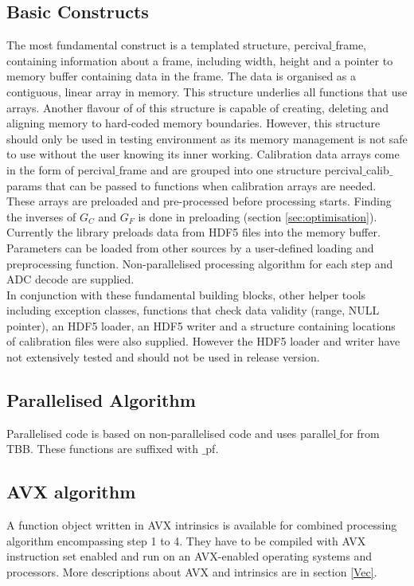 \documentclass[journal]{IEEEtran}
\begin{document}
\subsection{Basic Constructs}
The most fundamental construct is a templated structure, percival$\_$frame, containing information about a frame, including width, height and a pointer to memory buffer containing data in the frame. The data is organised as a contiguous, linear array in memory. This structure underlies all functions that use arrays. Another flavour of of this structure is capable of creating, deleting and aligning memory to hard-coded memory boundaries. However, this structure should only be used in testing environment as its memory management is not safe to use without the user knowing its inner working. Calibration data arrays come in the form of percival$\_$frame and are grouped into one structure percival$\_$calib$\_$params that can be passed to functions when calibration arrays are needed. These arrays are preloaded and pre-processed before processing starts. Finding the inverses of $G_C$ and $G_F$ is done in preloading (section \ref{sec:optimisation}). Currently the library preloads data from HDF5 files into the memory buffer. Parameters can be loaded from other sources by a user-defined loading and preprocessing function. Non-parallelised processing algorithm for each step and ADC decode are supplied. \\
In conjunction with these fundamental building blocks, other helper tools including exception classes, functions that check data validity (range, NULL pointer), an HDF5 loader, an HDF5 writer and a structure containing locations of calibration files were also supplied. However the HDF5 loader and writer have not extensively tested and should not be used in release version.

\subsection{Parallelised Algorithm}
Parallelised code is based on non-parallelised code and uses parallel$\_$for from TBB. These functions are suffixed with $\_$pf.

\subsection{AVX algorithm}
A function object written in AVX intrinsics is available for combined processing algorithm encompassing step 1 to 4. They have to be compiled with AVX instruction set enabled and run on an AVX-enabled operating systems and processors. More descriptions about AVX and intrinsics are in section \ref{Vec}.
\end{document}
